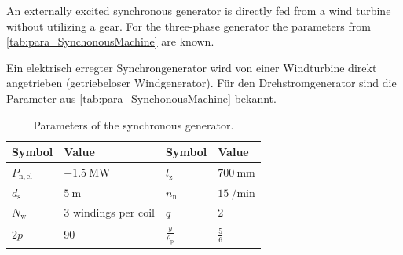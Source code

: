 

An externally excited synchronous generator is directly fed from a wind turbine without utilizing a gear.
For the three-phase generator the parameters from \autoref{tab:para_SynchonousMachine} are known.

\vspace{1em}
\begin{germanblock}
    Ein elektrisch erregter Synchrongenerator wird von einer Windturbine direkt angetrieben (getriebeloser Windgenerator). Für den Drehstromgenerator sind die Parameter aus \autoref{tab:para_SynchonousMachine} bekannt.
\end{germanblock}

\begin{table}[htb]
    \caption{Parameters of the synchronous generator.}
    \centering
    \begin{tabular}{llll}\toprule
        Symbol              & Value                   & Symbol                        & Value                    \\
        \midrule
        $P_{\mathrm{n,el}}$ & $\SI{-1.5}{\mega\watt}$ & $l_{\mathrm{z}}$              & $\SI{700}{\milli\metre}$ \\
        $d_{\mathrm{s}}$    & $\SI{5}{\metre}$        & $n_{\mathrm{n}}$              & $\SI{15}{\per\minute}$   \\
        $N_{\mathrm{w}}$    & 3 windings per coil     & $q$                           & 2                        \\
        $2p$                & 90                      & $\frac{y}{\rho_{\mathrm{p}}}$ & $\frac{5}{6}$            \\
        \bottomrule
    \end{tabular}
    \label{tab:para_SynchonousMachine}
\end{table}
\vspace{-1.3em}

